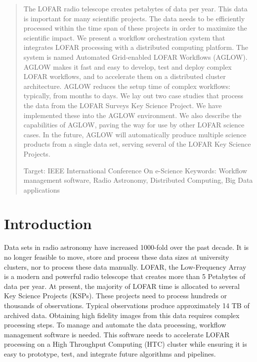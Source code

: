 \begin{abstract}

The LOFAR radio telescope creates petabytes of data per year. This data is important for many scientific projects. The data needs to be efficiently processed within the time span of these projects in order to maximize the scientific impact. We present a workflow orchestration system that integrates LOFAR processing with a distributed computing platform. The system is named Automated Grid-enabled LOFAR Workflows (AGLOW). AGLOW makes it fast and easy to develop, test and deploy complex LOFAR workflows, and to accelerate them on a distributed cluster architecture. AGLOW reduces the setup time of complex workflows: typically, from months to days. We lay out two case studies that process the data from the LOFAR Surveys Key Science Project. We have implemented these into the AGLOW environment. We also describe the capabilities of AGLOW, paving the way for use by other LOFAR science cases. In the future, AGLOW will automatically produce multiple science products from a single data set, serving several of the LOFAR Key Science Projects.

Target:  IEEE International Conference On e-Science
Keywords: Workflow management software, Radio Astronomy, Distributed Computing, Big Data applications
\end{abstract}


\section{Introduction}\label{sec:ch5_intro}

Data sets in radio astronomy have increased 1000-fold over the past decade\cite{sabater_datasize}. It is no longer feasible to move, store and process these data sizes at university clusters, nor to process these data manually. LOFAR, the Low-Frequency Array\cite{LOFAR} is a modern and powerful radio telescope that creates more than 5 Petabytes of data per year. At present, the majority of LOFAR time is allocated to several Key Science Projects (KSPs)\cite{lotss}. These projects need to process hundreds or thousands of observations. Typical observations produce approximately 14 TB of archived data. Obtaining high fidelity images from this data requires complex processing steps. To manage and automate the data processing, workflow management software is needed. This software needs to accelerate LOFAR processing on a High Throughput Computing (HTC) cluster while ensuring it is easy to prototype, test, and integrate future algorithms and pipelines. 
	
